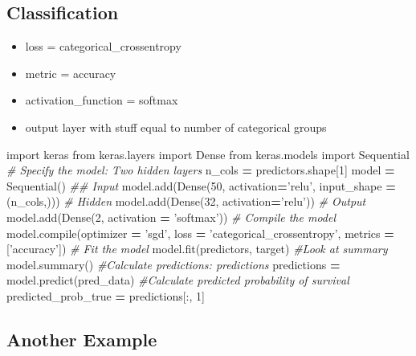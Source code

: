 \documentclass[]{book}
\newenvironment{Shaded}{\begin{snugshade}}{\end{snugshade}}
\newcommand{\DecValTok}[1]{\textcolor[rgb]{0.00,0.00,0.81}{#1}}
\newcommand{\StringTok}[1]{\textcolor[rgb]{0.31,0.60,0.02}{#1}}
\newcommand{\ImportTok}[1]{#1}
\newcommand{\CommentTok}[1]{\textcolor[rgb]{0.56,0.35,0.01}{\textit{#1}}}
\newcommand{\OperatorTok}[1]{\textcolor[rgb]{0.81,0.36,0.00}{\textbf{#1}}}
\newcommand{\BuiltInTok}[1]{#1}
\newcommand{\NormalTok}[1]{#1}
\theoremstyle{definition}
\theoremstyle{definition}
\theoremstyle{definition}
\theoremstyle{remark}
\begin{document}
\subsection{Classification}\label{classification}

\begin{itemize}
\item
  loss = categorical\_crossentropy
\item
  metric = accuracy
\item
  activation\_function = softmax
\item
  output layer with stuff equal to number of categorical groups
\end{itemize}

\begin{Shaded}
\begin{Highlighting}[]
\ImportTok{import}\NormalTok{ keras}
\ImportTok{from}\NormalTok{ keras.layers }\ImportTok{import}\NormalTok{ Dense}
\ImportTok{from}\NormalTok{ keras.models }\ImportTok{import}\NormalTok{ Sequential}
\CommentTok{# Specify the model: Two hidden layers}
\NormalTok{n_cols }\OperatorTok{=}\NormalTok{ predictors.shape[}\DecValTok{1}\NormalTok{]}
\NormalTok{model }\OperatorTok{=}\NormalTok{ Sequential()}
\CommentTok{## Input}
\NormalTok{model.add(Dense(}\DecValTok{50}\NormalTok{, activation}\OperatorTok{=}\StringTok{'relu'}\NormalTok{, input_shape }\OperatorTok{=}\NormalTok{ (n_cols,)))}
\CommentTok{# Hidden}
\NormalTok{model.add(Dense(}\DecValTok{32}\NormalTok{, activation}\OperatorTok{=}\StringTok{'relu'}\NormalTok{))}
\CommentTok{# Output}
\NormalTok{model.add(Dense(}\DecValTok{2}\NormalTok{, activation }\OperatorTok{=} \StringTok{'softmax'}\NormalTok{))}
\CommentTok{# Compile the model}
\NormalTok{model.}\BuiltInTok{compile}\NormalTok{(optimizer }\OperatorTok{=} \StringTok{'sgd'}\NormalTok{, loss }\OperatorTok{=} \StringTok{'categorical_crossentropy'}\NormalTok{, metrics }\OperatorTok{=}\NormalTok{ [}\StringTok{'accuracy'}\NormalTok{])}
\CommentTok{# Fit the model}
\NormalTok{model.fit(predictors, target)}
\CommentTok{#Look at summary}
\NormalTok{model.summary()}
\CommentTok{#Calculate predictions: predictions}
\NormalTok{predictions }\OperatorTok{=}\NormalTok{ model.predict(pred_data)}
\CommentTok{#Calculate predicted probability of survival}
\NormalTok{predicted_prob_true }\OperatorTok{=}\NormalTok{ predictions[:, }\DecValTok{1}\NormalTok{]}
\end{Highlighting}
\end{Shaded}

\subsection{Another Example}\label{another-example}
\end{document}
